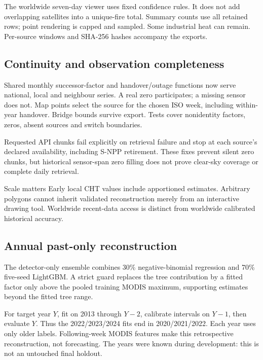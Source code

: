 The worldwide seven-day viewer uses fixed confidence rules. It does not add overlapping satellites into a unique-fire total. Summary counts use all retained rows; point rendering is capped and sampled. Some industrial heat can remain. Per-source windows and SHA-256 hashes accompany the exports.

\subsection{Continuity and observation completeness}
Shared monthly successor-factor and handover/outage functions now serve national, local and neighbour series. A real zero participates; a missing sensor does not. Map points select the source for the chosen ISO week, including within-year handover. Bridge bounds survive export. Tests cover nonidentity factors, zeros, absent sources and switch boundaries.

Requested API chunks fail explicitly on retrieval failure and stop at each source's declared availability, including S-NPP retirement. These fixes prevent silent zero chunks, but historical sensor-span zero filling does not prove clear-sky coverage or complete daily retrieval.

\begin{keypoint}{Scale matters}
Early local CHT values include apportioned estimates. Arbitrary polygons cannot inherit validated reconstruction merely from an interactive drawing tool. Worldwide recent-data access is distinct from worldwide calibrated historical accuracy.
\end{keypoint}


\subsection{Annual past-only reconstruction}
The detector-only ensemble combines 30\% negative-binomial regression and 70\% five-seed LightGBM. A strict guard replaces the tree contribution by a fitted factor only above the pooled training MODIS maximum, supporting estimates beyond the fitted tree range.

For target year \(Y\), fit on 2013 through \(Y-2\), calibrate intervals on \(Y-1\), then evaluate \(Y\). Thus the 2022/2023/2024 fits end in 2020/2021/2022. Each year uses only older labels. Following-week MODIS features make this retrospective reconstruction, not forecasting. The years were known during development: this is not an untouched final holdout.

